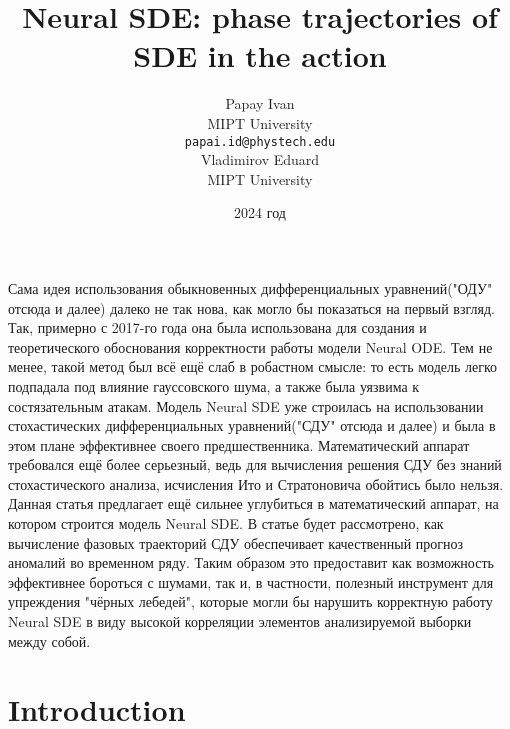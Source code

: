 \documentclass{article}
\title{Neural SDE: phase trajectories of SDE in the action}
\author{ Papay Ivan\\
	MIPT University \\
	\texttt{papai.id@phystech.edu} \\
	\And
	Vladimirov Eduard \\
	MIPT University\\
}
\date{2024 год}
\begin{document}
\maketitle

\begin{Аннотация}
    Сама идея использования обыкновенных дифференциальных уравнений("ОДУ" отсюда и далее) далеко не так нова, как могло бы показаться на первый взгляд. Так, примерно с 2017-го года она была использована для создания и теоретического обоснования корректности работы модели Neural ODE. Тем не менее, такой метод был всё ещё слаб в робастном смысле: то есть модель легко подпадала под влияние гауссовского шума, а также была уязвима к состязательным атакам. Модель Neural SDE уже строилась на использовании стохастических дифференциальных уравнений("СДУ" отсюда и далее) и была в этом плане эффективнее своего предшественника. Математический аппарат требовался ещё более серьезный, ведь для вычисления решения СДУ без знаний стохастического анализа, исчисления Ито и Стратоновича обойтись было нельзя. Данная статья предлагает ещё сильнее углубиться в математический аппарат, на котором строится модель Neural SDE. В статье будет рассмотрено, как вычисление фазовых траекторий СДУ обеспечивает качественный прогноз аномалий во временном ряду. Таким образом это предоставит как возможность эффективнее бороться с шумами, так и, в частности, полезный инструмент для упреждения "чёрных лебедей", которые могли бы нарушить корректную работу Neural SDE в виду высокой корреляции элементов анализируемой выборки между собой.
    
\end{Аннотация}



\section{Introduction}
\end{document}
